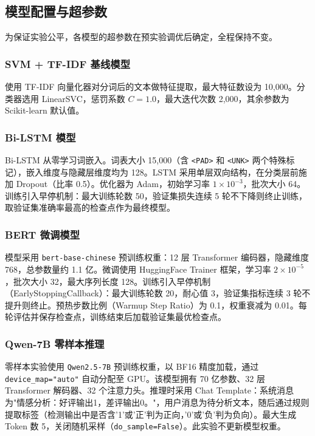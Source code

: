 \subsection{模型配置与超参数}
\label{sec:hyperparams}

为保证实验公平，各模型的超参数在预实验调优后确定，全程保持不变。

\subsubsection{SVM + TF-IDF 基线模型}

使用 TF-IDF 向量化器对分词后的文本做特征提取，最大特征数设为 10,000。分类器选用 LinearSVC，惩罚系数 $C = 1.0$，最大迭代次数 2,000，其余参数为 Scikit-learn 默认值。

\subsubsection{Bi-LSTM 模型}

Bi-LSTM 从零学习词嵌入。词表大小 15,000（含 \texttt{<PAD>} 和 \texttt{<UNK>} 两个特殊标记），嵌入维度与隐藏层维度均为 128。LSTM 采用单层双向结构，在分类层前施加 Dropout（比率 0.5）。优化器为 Adam，初始学习率 $1 \times 10^{-3}$，批次大小 64。训练引入早停机制：最大训练轮数 50，验证集损失连续 5 轮不下降则终止训练，取验证集准确率最高的检查点作为最终模型。

\subsubsection{BERT 微调模型}

模型采用 \texttt{bert-base-chinese} 预训练权重：12 层 Transformer 编码器，隐藏维度 768，总参数量约 1.1 亿。微调使用 HuggingFace Trainer 框架，学习率 $2 \times 10^{-5}$，批次大小 32，最大序列长度 128。训练引入早停机制（EarlyStoppingCallback）：最大训练轮数 20，耐心值 3，验证集指标连续 3 轮不提升则终止。预热步数比例（Warmup Step Ratio）为 0.1，权重衰减为 0.01。每轮评估并保存检查点，训练结束后加载验证集最优检查点。

\subsubsection{Qwen-7B 零样本推理}

零样本实验使用 \texttt{Qwen2.5-7B} 预训练权重，以 BF16 精度加载，通过 \texttt{device\_map="auto"} 自动分配至 GPU。该模型拥有 70 亿参数、32 层 Transformer 解码器、32 个注意力头。推理时采用 Chat Template：系统消息为"情感分析：好评输出1，差评输出0。"，用户消息为待分析文本，随后通过规则提取标签（检测输出中是否含'1'或'正'判为正向，'0'或'负'判为负向）。最大生成 Token 数 5，关闭随机采样（\texttt{do\_sample=False}）。此实验不更新模型权重。

